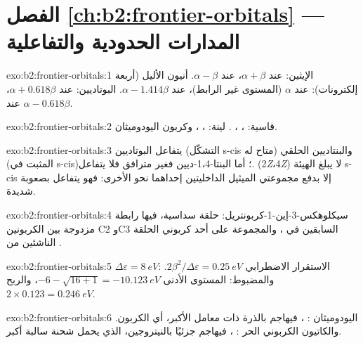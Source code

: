 \section*{الفصل \ref{ch:b2:frontier-orbitals} --- المدارات الحدودية والتفاعلية}

\begin{solution}{exo:b2:frontier-orbitals:1}
الإيثين:  عند $\alpha + \beta$،  عند $\alpha - \beta$. أنيون الأليل (أربعة إلكترونات):  عند $\alpha$ (المستوى
غير الرابط)،  عند $\alpha - 1.414\beta$. البوتاديين:  عند $\alpha + 0.618\beta$،  عند $\alpha -
0.618\beta$.
\end{solution}

\begin{solution}{exo:b2:frontier-orbitals:2}
قاسية: ، ، . لينة: ، ، وكربون اليودوميثان.
\end{solution}

\begin{solution}{exo:b2:frontier-orbitals:3}
يتفاعل البوتاديين (التشكّل s-cis متاح له) والبنتاديين الحلقي (المثبت في s-cis)؛
أما البنتا-1،4-ديين فغير مترافق فلا يتفاعل.  (2\textit{Z}،4\textit{Z}) لا يبلغ
الهيئة s-cis إلا بدفع مجموعتي الميثيل الداخليتين إحداهما نحو الأخرى: فهو
يتفاعل بصعوبة شديدة.
\end{solution}

\begin{solution}{exo:b2:frontier-orbitals:4}
سيكلوهكس-3-إين-1-كربونتريل: حلقة سداسية، فيها رابطة مزدوجة بين الكربونين C2
وC3 السابقين في ، والمجموعة  على أحد كربوني الحلقة الناشئين من
.
\end{solution}

\begin{solution}{exo:b2:frontier-orbitals:5}
$\Delta\varepsilon = \qty{8}{eV}$: الاستقرار الاضطرابي $2\beta^2/\Delta\varepsilon = \qty{0.25}{eV}$. والمضبوط: المستوى الأدنى
$-6 - \sqrt{16 + 1} = \qty{-10.123}{eV}$، والربح $2 \times 0.123 = \qty{0.246}{eV}$.
\end{solution}

\begin{solution}{exo:b2:frontier-orbitals:6}
اليودوميثان : ، فيهاجم بالذرة ذات معامل
 الأكبر، أي الكربون. والكاتيون الكربوني الحر : ،
فيهاجم جزئيًا بالنيتروجين، الذي يحمل شحنة سالبة أكبر.
\end{solution}

